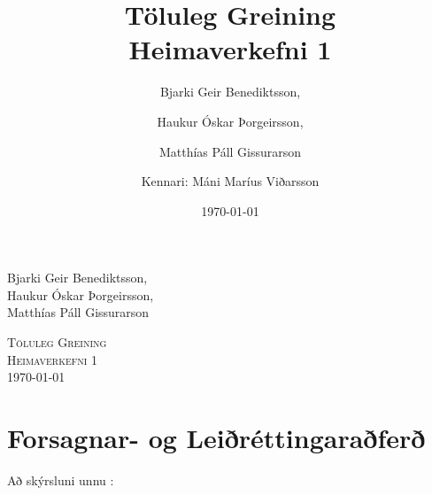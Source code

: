 \documentclass[a4]{article}
\title{Töluleg Greining\\ Heimaverkefni 1}
\date{\today{}}
\author{ 
  Bjarki Geir Benediktsson,\and
  Haukur Óskar Þorgeirsson,\and
  Matthías Páll Gissurarson \and
  Kennari: Máni Maríus Viðarsson
  }
\begin{document}
\begin{flushright}
  Bjarki Geir Benediktsson,\\
  Haukur Óskar Þorgeirsson,\\
  Matthías Páll Gissurarson\\
\end{flushright}

\begin{center}
 \textsc{ \LARGE Töluleg Greining\\
  Heimaverkefni 1\\
  \today{}
  }
  \end{center}
\vfill

\maketitle
\section{Forsagnar- og Leiðréttingaraðferð}



\vspace{20 mm}
Að skýrsluni unnu :
\hspace{0.5cm} \makebox[1.5in]{\hrulefill}
\hspace{0.5cm} \makebox[1.5in]{\hrulefill}
\hspace{0.5cm} \makebox[1.5in]{\hrulefill}
\end{document}
